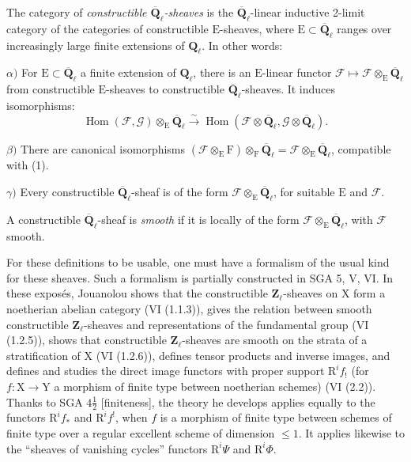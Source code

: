 \documentclass[11pt,leqno]{article}
\begin{document}
The category of \textit{constructible \(\overline{\mathbf{Q}}_\ell\)-sheaves} is the \(\overline{\mathbf{Q}}_\ell\)-linear inductive 2-limit category of the categories of constructible \(\mathrm{E}\)-sheaves, where \(\mathrm{E}\subset\overline{\mathbf{Q}}_\ell\) ranges over increasingly large finite extensions of \(\mathbf{Q}_\ell\). In other words:

\noindent \(\alpha)\) For \(\mathrm{E}\subset\overline{\mathbf{Q}}_\ell\) a finite extension of \(\mathbf{Q}_\ell\), there is an \(\mathrm{E}\)-linear functor \(\mathscr{F}\mapsto\mathscr{F}\otimes_{\mathrm{E}}\overline{\mathbf{Q}}_\ell\) from constructible \(\mathrm{E}\)-sheaves to constructible \(\overline{\mathbf{Q}}_\ell\)-sheaves. It induces isomorphisms:
\[
\operatorname{Hom}(\mathscr{F},\mathscr{G})\otimes_{\mathrm{E}}\overline{\mathbf{Q}}_\ell
\overset{\sim}{\to}
\operatorname{Hom}(\mathscr{F}\otimes\overline{\mathbf{Q}}_\ell,\mathscr{G}\otimes\overline{\mathbf{Q}}_\ell).
\]

\noindent \(\beta)\) There are canonical isomorphisms \((\mathscr{F}\otimes_{\mathrm{E}}\mathrm{F})\otimes_{\mathrm{F}}\overline{\mathbf{Q}}_\ell=\mathscr{F}\otimes_{\mathrm{E}}\overline{\mathbf{Q}}_\ell\), compatible with (1).

\noindent \(\gamma)\) Every constructible \(\overline{\mathbf{Q}}_\ell\)-sheaf is of the form \(\mathscr{F}\otimes_{\mathrm{E}}\overline{\mathbf{Q}}_\ell\), for suitable \(\mathrm{E}\) and \(\mathscr{F}\).

A constructible \(\overline{\mathbf{Q}}_\ell\)-sheaf is \textit{smooth} if it is locally of the form \(\mathscr{F}\otimes_{\mathrm{E}}\overline{\mathbf{Q}}_\ell\), with \(\mathscr{F}\) smooth.

For these definitions to be usable, one must have a formalism of the usual kind for these sheaves. Such a formalism is partially constructed in SGA 5, V, VI. In these exposés, Jouanolou shows that the constructible \(\mathbf{Z}_\ell\)-sheaves on \(\mathrm{X}\) form a noetherian abelian category (VI (1.1.3)), gives the relation between smooth constructible \(\mathbf{Z}_\ell\)-sheaves and representations of the fundamental group (VI (1.2.5)), shows that constructible \(\mathbf{Z}_\ell\)-sheaves are smooth on the strata of a stratification of \(\mathrm{X}\) (VI (1.2.6)), defines tensor products and inverse images, and defines and studies the direct image functors with proper support \(\mathrm{R}^i f_!\) (for \(f:\mathrm{X}\to\mathrm{Y}\) a morphism of finite type between noetherian schemes) (VI (2.2)). Thanks to SGA \(4\frac{1}{2}\) [finiteness], the theory he develops applies equally to the functors \(\mathrm{R}^i f_*\) and \(\mathrm{R}^i f^!\), when \(f\) is a morphism of finite type between schemes of finite type over a regular excellent scheme of dimension \(\leq1\). It applies likewise to the “sheaves of vanishing cycles” functors \(\mathrm{R}^i\Psi\) and \(\mathrm{R}^i\Phi\).
\end{document}
